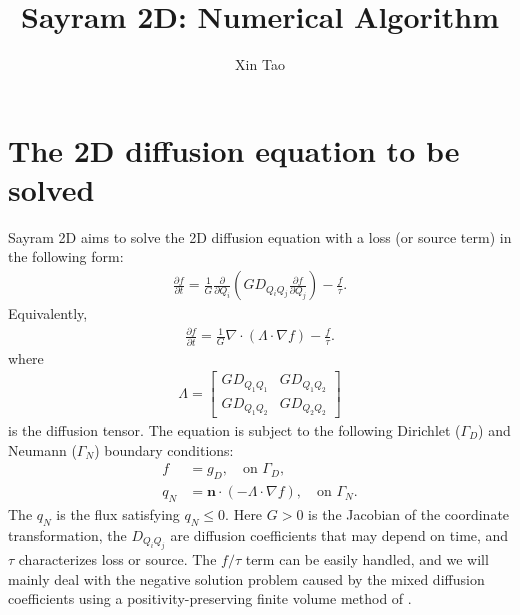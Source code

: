 \documentclass[11pt]{article}
\title{Sayram 2D: Numerical Algorithm}
\author{Xin Tao}
\begin{document}
\maketitle

\section{The 2D diffusion equation to be solved}
Sayram 2D aims to solve the 2D diffusion equation with a loss (or source term)
in the following form:
\begin{align}
   \frac{\partial f}{\partial t} = \frac{1}{G} \frac{\partial }{\partial Q_{i}}\left(G D_{Q_{i}Q_{j}}\frac{\partial f}{\partial Q_{j}}\right) - \frac{f}{\tau}. 
\end{align}
Equivalently,
\begin{align}
  \frac{\partial f}{\partial t} = \frac{1}{G}\nabla \cdot(\Lambda \cdot \nabla f) - \frac{f}{\tau}.
  \label{eq:general_2d_eq}
\end{align}
where 
\begin{align}
  \Lambda = \begin{bmatrix}
    GD_{Q_1Q_1} & GD_{Q_1Q_2} \\
    GD_{Q_1Q_2} & GD_{Q_2Q_2}
  \end{bmatrix}
\end{align}
is the diffusion tensor. The equation is subject to the following Dirichlet
($\Gamma_{D}$) and Neumann ($\Gamma_{N}$) boundary conditions:
\begin{align}
  f &= g_{D}, \quad \text{on } \Gamma_{D}, \\ 
  q_{N} &= \boldsymbol{n}\cdot \left(-\Lambda \cdot \nabla f\right), \quad \text{on } \Gamma_{N}.
\end{align}
The $q_{N}$ is the flux satisfying $q_{N} \leq 0$. Here $G > 0$ is the
Jacobian of the coordinate transformation, the $D_{Q_{i}Q_{j}}$ are diffusion
coefficients that may depend on time, and $\tau$ characterizes loss or
source. The $f/\tau$ term can be easily handled, and we will mainly deal with
the negative solution problem caused by the mixed diffusion coefficients using a
positivity-preserving finite volume method of .
\end{document}
